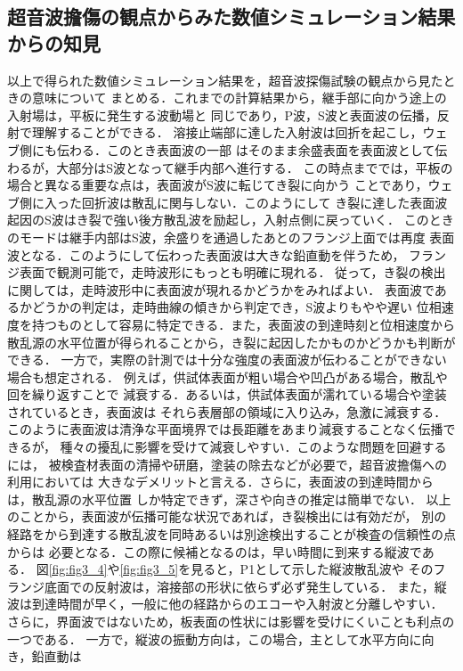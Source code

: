 \subsection{超音波擔傷の観点からみた数値シミュレーション結果からの知見}
以上で得られた数値シミュレーション結果を，超音波探傷試験の観点から見たときの意味について
まとめる．これまでの計算結果から，継手部に向かう途上の入射場は，平板に発生する波動場と
同じであり，P波，S波と表面波の伝播，反射で理解することができる．
溶接止端部に達した入射波は回折を起こし，ウェブ側にも伝わる．このとき表面波の一部
はそのまま余盛表面を表面波として伝わるが，大部分はS波となって継手内部へ進行する．
この時点まででは，平板の場合と異なる重要な点は，表面波がS波に転じてき裂に向かう
ことであり，ウェブ側に入った回折波は散乱に関与しない．このようにして
き裂に達した表面波起因のS波はき裂で強い後方散乱波を励起し，入射点側に戻っていく．
このときのモードは継手内部はS波，余盛りを通過したあとのフランジ上面では再度
表面波となる．このようにして伝わった表面波は大きな鉛直動を伴うため，
フランジ表面で観測可能で，走時波形にもっとも明確に現れる．
従って，き裂の検出に関しては，走時波形中に表面波が現れるかどうかをみればよい．
表面波であるかどうかの判定は，走時曲線の傾きから判定でき，S波よりもやや遅い
位相速度を持つものとして容易に特定できる．また，表面波の到達時刻と位相速度から
散乱源の水平位置が得られることから，き裂に起因したかものかどうかも判断ができる．
一方で，実際の計測では十分な強度の表面波が伝わることができない場合も想定される．
例えば，供試体表面が粗い場合や凹凸がある場合，散乱や回を繰り返すことで
減衰する．あるいは，供試体表面が濡れている場合や塗装されているとき，表面波は
それら表層部の領域に入り込み，急激に減衰する．
このように表面波は清浄な平面境界では長距離をあまり減衰することなく伝播できるが，
種々の擾乱に影響を受けて減衰しやすい．このような問題を回避するには，
被検査材表面の清掃や研磨，塗装の除去などが必要で，超音波擔傷への利用においては
大きなデメリットと言える．さらに，表面波の到達時間からは，散乱源の水平位置
しか特定できず，深さや向きの推定は簡単でない．
以上のことから，表面波が伝播可能な状況であれば，き裂検出には有効だが，
別の経路をから到達する散乱波を同時あるいは別途検出することが検査の信頼性の点からは
必要となる．この際に候補となるのは，早い時間に到来する縦波である．
図\ref{fig:fig3_4}や\ref{fig:fig3_5}を見ると，P1として示した縦波散乱波や
そのフランジ底面での反射波は，溶接部の形状に依らず必ず発生している．
また，縦波は到達時間が早く，一般に他の経路からのエコーや入射波と分離しやすい．
さらに，界面波ではないため，板表面の性状には影響を受けにくいことも利点の一つである．
一方で，縦波の振動方向は，この場合，主として水平方向に向き，鉛直動は
